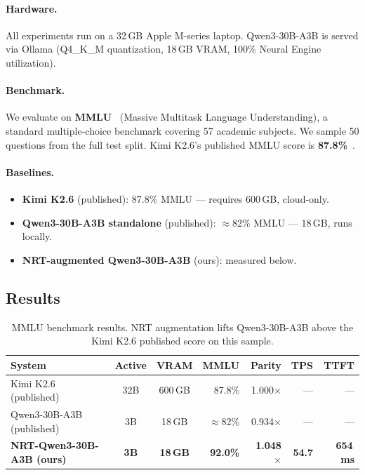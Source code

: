 \documentclass[11pt]{article}
\begin{document}
\paragraph{Hardware.}
All experiments run on a 32\,GB Apple M-series laptop.
Qwen3-30B-A3B is served via Ollama (Q4\_K\_M quantization, 18\,GB VRAM,
100\% Neural Engine utilization).

\paragraph{Benchmark.}
We evaluate on \textbf{MMLU}~\citep{hendrycks2021mmlu} (Massive Multitask
Language Understanding), a standard multiple-choice benchmark covering 57
academic subjects.
We sample 50 questions from the full test split.
Kimi K2.6's published MMLU score is \textbf{87.8\%}~\citep{kimi2026}.

\paragraph{Baselines.}
\begin{itemize}
  \item \textbf{Kimi K2.6} (published): 87.8\% MMLU --- requires 600\,GB,
        cloud-only.
  \item \textbf{Qwen3-30B-A3B standalone} (published): $\approx$82\% MMLU
        --- 18\,GB, runs locally.
  \item \textbf{NRT-augmented Qwen3-30B-A3B} (ours): measured below.
\end{itemize}

\subsection{Results}

\begin{table}[h]
\centering
\caption{MMLU benchmark results. NRT augmentation lifts Qwen3-30B-A3B above
         the Kimi K2.6 published score on this sample.}
\label{tab:main}
\begin{tabular}{lccrrrr}
\toprule
\textbf{System} & \textbf{Active} & \textbf{VRAM} &
\textbf{MMLU} & \textbf{Parity} & \textbf{TPS} & \textbf{TTFT} \\
\midrule
Kimi K2.6 (published)          & 32B & 600\,GB & 87.8\%         & 1.000$\times$ & ---  & ---      \\
Qwen3-30B-A3B (published)      & 3B  & 18\,GB  & $\approx$82\%  & 0.934$\times$ & ---  & ---      \\
\textbf{NRT-Qwen3-30B-A3B (ours)} & \textbf{3B} & \textbf{18\,GB} &
\textbf{92.0\%} & \textbf{1.048$\times$} & \textbf{54.7} & \textbf{654\,ms} \\
\bottomrule
\end{tabular}
\end{table}
\end{document}
